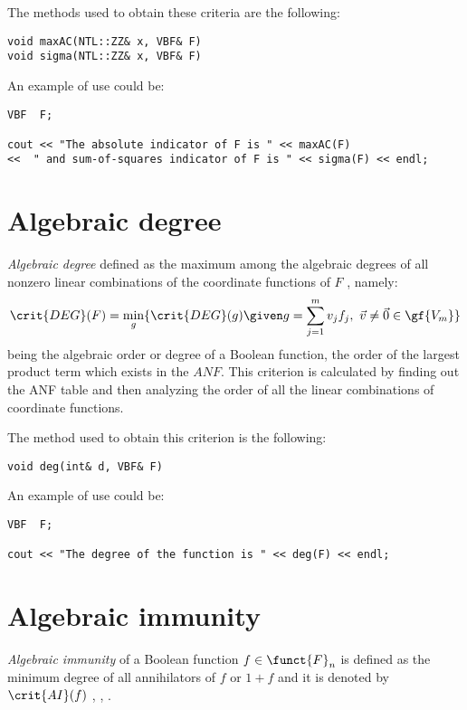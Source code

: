 The methods used to obtain these criteria are the following:

\begin{verbatim}
void maxAC(NTL::ZZ& x, VBF& F)
void sigma(NTL::ZZ& x, VBF& F)
\end{verbatim}

An example of use could be:

\begin{verbatim}
VBF  F;

cout << "The absolute indicator of F is " << maxAC(F) 
<<  " and sum-of-squares indicator of F is " << sigma(F) << endl;
\end{verbatim}

\section{Algebraic degree}

\textsl{Algebraic degree} defined as the maximum among the algebraic
  degrees of all nonzero linear combinations of the coordinate functions of
  $F$ \cite{Nyberg:92}, namely: 
\begin{equation}
    \crit{DEG}(F) = \min_g \{\crit{DEG}(g) \given g = \sum_{j=1}^{m} v_jf_j , \  \vec{v}
    \neq \vec{0} \in \gf{V_m} \} 
\end{equation}
being the algebraic order or degree of a Boolean function, the order of the
largest product term which exists in the $ANF$. This criterion is calculated
by finding out the ANF table and then analyzing the order of all the linear
combinations of coordinate functions. 

The method used to obtain this criterion is the following:

\begin{verbatim}
void deg(int& d, VBF& F)
\end{verbatim}

An example of use could be:

\begin{verbatim}
VBF  F;

cout << "The degree of the function is " << deg(F) << endl;
\end{verbatim}

\section{Algebraic immunity}

\textsl{Algebraic immunity} of a Boolean function $f \in \funct{F}_n$ is defined as 
the minimum degree of all annihilators of $f$ or $1+f$ and it is denoted by $\crit{AI}(f)$ \cite{Courtois:03}, \cite{CourtoisM:02}, \cite{FaugereA:03}. 

